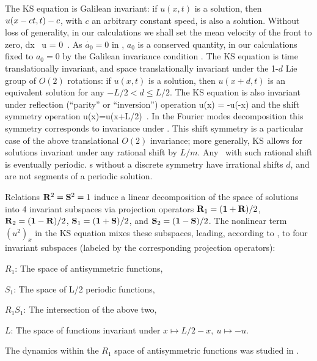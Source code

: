 The  KS equation is
Galilean invariant: if $u(x,t)$ is a solution, then
$u(x -ct,t) -c $, with $c$ an arbitrary constant speed, 
is also a solution.
Without loss of generality, in our calculations we shall set
the mean velocity of the  front to zero,
\beq
\int dx \, u = 0
\,.
As  $\dot{a_0}=0$ in ,
$a_0$ is a conserved quantity, in our calculations
fixed to $a_0=0$ by the Galilean invariance condition .
The KS equation   is time translationally invariant,
and
space translationally invariant
under the 1-$d$ Lie group of $O(2)$ rotations: if
$u(x,t)$ is a solution, then $u(x+d,t)$ is an equivalent
solution for any $-L/2 < d \leq L/2$.
The KS equation is also invariant under
reflection (``parity'' or ``inversion'') operation
\beq
\Refl u(x) = -u(-x)
and the shift symmetry operation
\beq
\Shift u(x)=u(x+L/2)
\,.
In the Fourier modes decomposition  this
symmetry corresponds to invariance under
.
This shift symmetry is a particular case of the
above translational $O(2)$ invariance; more generally,
KS allows for solutions invariant under any rational shift by
$L/m$. Any \rpo\ with such rational shift is eventually periodic.
\Rpo s without a discrete symmetry have irrational shifts
$d$, and are not segments of a periodic solution.


Relations $\mathbf{R}^2=\mathbf{S}^2=1$
induce a linear decomposition of the space of solutions into 4 invariant
subspaces via projection operators
$\mathbf{R}_1=(\mathbf 1+\mathbf{R})/2$,
$\mathbf{R}_2=(\mathbf 1-\mathbf{R})/2$,
$\mathbf{S}_1=(\mathbf 1+\mathbf{S})/2$, and
$\mathbf{S}_2=(\mathbf 1-\mathbf{S})/2$. The nonlinear term $(u^2)_x$ in the KS equation
mixes these subspaces, leading,
according to , to four invariant subspaces
(labeled by the corresponding projection operators):
\begin{romannum} %

 \item[$R_1$:] The space of antisymmetric functions,
 \item[$S_1$:] The space of L/2 periodic functions,
 \item[$R_1 S_1$:] The intersection of the above two,
 \item[$L$:] The space of functions invariant under $x\mapsto L/2-x,\ u\mapsto -u$.

\end{romannum} %
The dynamics within the $R_1$ space of antisymmetric functions
was studied in .


